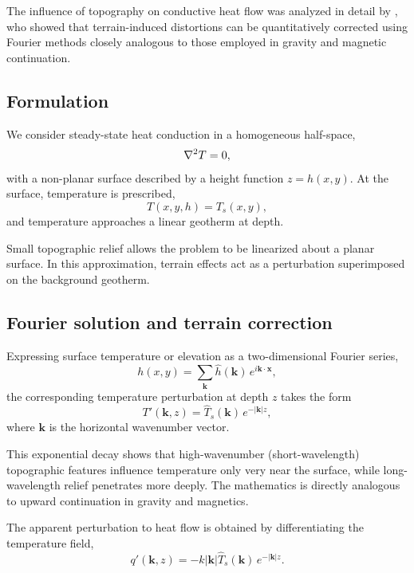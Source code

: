 The influence of topography on conductive heat flow was analyzed in detail by \citet{Blackwell_etal1980}, who showed that terrain-induced distortions can be quantitatively corrected using Fourier methods closely analogous to those employed in gravity and magnetic continuation.

\subsection{Formulation}

We consider steady-state heat conduction in a homogeneous half-space,
\[
    \laplacian T = 0,
\]
with a non-planar surface described by a height function $z = h(x,y)$. At the surface, temperature is prescribed,
\begin{equation}
    T(x,y,h) = T_s(x,y),
\end{equation}
and temperature approaches a linear geotherm at depth.

Small topographic relief allows the problem to be linearized about a planar surface.  In this approximation, terrain effects act as a perturbation superimposed on the background geotherm.

\subsection{Fourier solution and terrain correction}

Expressing surface temperature or elevation as a two-dimensional Fourier series,
\begin{equation}
    h(x,y) = \sum_{\mathbf{k}} \hat{h}(\mathbf{k})
    \,e^{i\mathbf{k}\cdot\mathbf{x}},
\end{equation}
the corresponding temperature perturbation at depth $z$ takes the form
\begin{equation}
    T'(\mathbf{k},z) = \hat{T}_s(\mathbf{k}) \,e^{-|\mathbf{k}| z},
\end{equation}
where $\mathbf{k}$ is the horizontal wavenumber vector.

This exponential decay shows that high-wavenumber (short-wavelength) topographic features influence temperature only very near the surface, while long-wavelength relief penetrates more deeply. The mathematics is directly analogous to upward continuation in gravity and magnetics.

The apparent perturbation to heat flow is obtained by differentiating the temperature field,
\begin{equation}
    q'(\mathbf{k},z) =
    - k |\mathbf{k}| \hat{T}_s(\mathbf{k})
    \,e^{-|\mathbf{k}| z}.
\end{equation}

